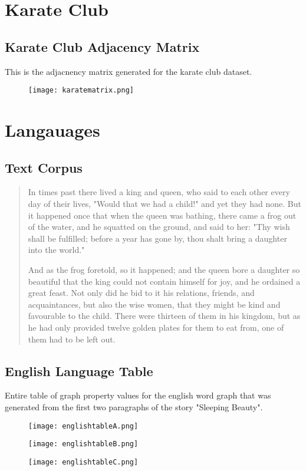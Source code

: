 \begin{appendices}
\chapter{Karate Club}
\section{Karate Club Adjacency Matrix}\label{app:karateadj}
This is the adjacnency matrix generated for the karate club dataset.
\begin{figure}[H]
	\centering
	\texttt{[image: karatematrix.png]}
\end{figure}

\chapter{Langauages}
\section{Text Corpus}\label{textcorpus}
\begin{quote}
In times past there lived a king and queen, who said to each other every day of their lives, "Would that we had a child!" and yet they had none. But it happened once that when the queen was bathing, there came a frog out of the water, and he squatted on the ground, and said to her: "Thy wish shall be fulfilled; before a year has gone by, thou shalt bring a daughter into the world."

And as the frog foretold, so it happened; and the queen bore a daughter so beautiful that the king could not contain himself for joy, and he ordained a great feast. Not only did he bid to it his relations, friends, and acquaintances, but also the wise women, that they might be kind and favourable to the child. There were thirteen of them in his kingdom, but as he had only provided twelve golden plates for them to eat from, one of them had to be left out.
\end{quote}
\section{English Language Table}\label{app:engtable}
Entire table of graph property values for the english word graph that was generated from the first two paragraphs of the story "Sleeping Beauty".
\begin{figure}[H]
	\centering
	\texttt{[image: englishtableA.png]}
\end{figure}
\begin{figure}[H]
	\centering
	\texttt{[image: englishtableB.png]}
\end{figure}
\begin{figure}[H]
	\centering
	\texttt{[image: englishtableC.png]}
\end{figure}

\end{appendices}